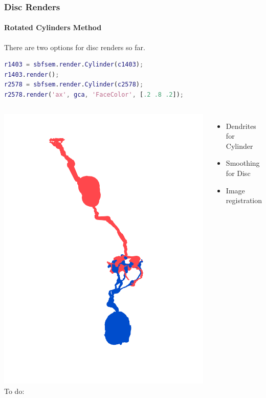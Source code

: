 \documentclass[11pt]{beamer}
\begin{document}
\begin{frame}[fragile]
	\frametitle{Disc Renders}
	\framesubtitle{Rotated Cylinders Method}
	There are two options for disc renders so far.
	\begin{lstlisting}[language=matlab]
r1403 = sbfsem.render.Cylinder(c1403);
r1403.render();
r2578 = sbfsem.render.Cylinder(c2578);
r2578.render('ax', gca, 'FaceColor', [.2 .8 .2]);\end{lstlisting}
	\begin{columns}
			\includegraphics[height=0.45\textheight]{smidget_path}
			To do:
			\begin{itemize}
				\item Dendrites for Cylinder
				\item Smoothing for Disc
				\item Image registration
			\end{itemize}
	\end{columns}
\end{frame}
\end{document}
